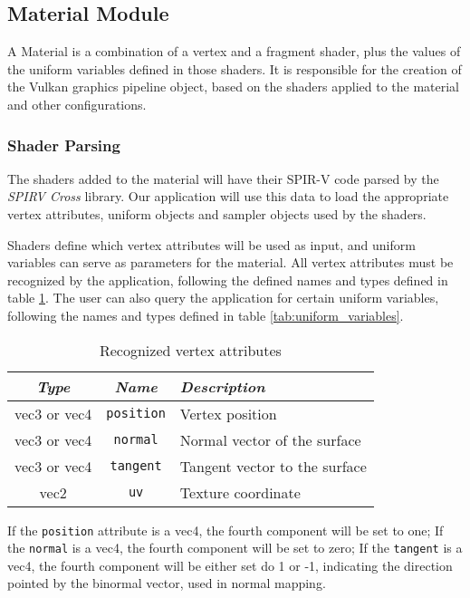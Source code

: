 \subsection{Material Module}
A Material is a combination of a vertex and a fragment shader, plus the values of the uniform variables defined in those shaders. It is responsible for the creation of the Vulkan graphics pipeline object, based on the shaders applied to the material and other configurations.

\subsubsection{Shader Parsing}
The shaders added to the material will have their SPIR-V code parsed by the \emph{SPIRV Cross} library. Our application will use this data to load the appropriate vertex attributes, uniform objects and sampler objects used by the shaders.

Shaders define which vertex attributes will be used as input, and uniform variables can serve as parameters for the material. All vertex attributes must be recognized by the application, following the defined names and types defined in table \ref{tab:vertex_attributes}. The user can also query the application for certain uniform variables, following the names and types defined in table \ref{tab:uniform_variables}.

\begin{table}[h]
    \centering
    \caption{Recognized vertex attributes}
    \begin{tabular}{|c|c|p{6cm}|}
    \hline
        \textit{Type} & \textit{Name} & \textit{Description} \\
        \hline \hline
        vec3 or vec4 & \texttt{position} & Vertex position \\
        vec3 or vec4 & \texttt{normal} & Normal vector of the surface \\
        vec3 or vec4 & \texttt{tangent} & Tangent vector to the surface \\
        vec2 & \texttt{uv} & Texture coordinate \\
        \hline
    \end{tabular}
    \label{tab:vertex_attributes}
\end{table}

If the \texttt{position} attribute is a vec4, the fourth component will be set to one; If the \texttt{normal} is a vec4, the fourth component will be set to zero; If the \texttt{tangent} is a vec4, the fourth component will be either set do 1 or -1, indicating the direction pointed by the binormal vector, used in normal mapping.

